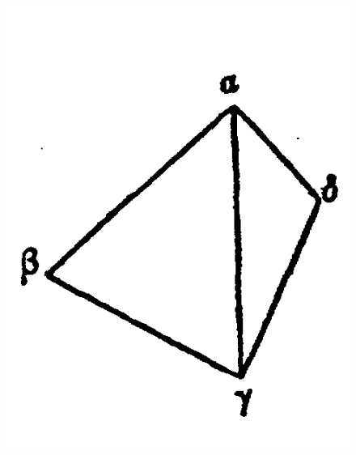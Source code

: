 \documentclass[12pt]{memoir}
\begin{document}
\begin{figure}
\begin{minipage}{.3\textwidth}
  \label{fig_12}
\end{minipage}
\begin{minipage}{.3\textwidth}
  \centering
  \includegraphics[width=\linewidth]{fig_13}
  \label{fig_13}
\end{minipage}
\end{figure}
\end{document}
